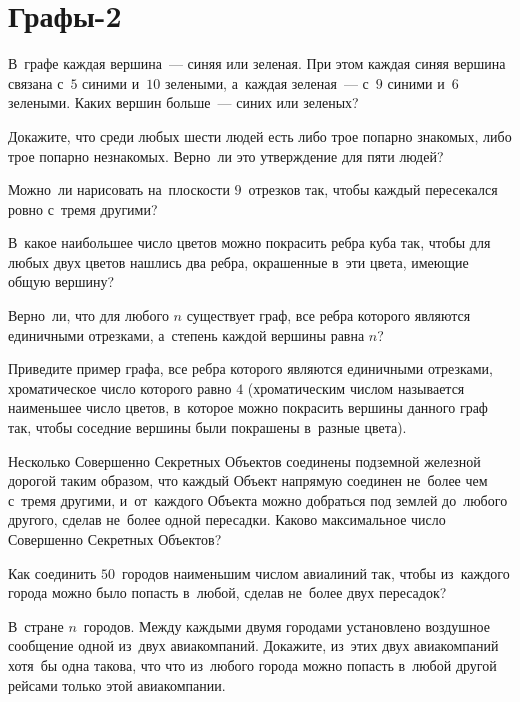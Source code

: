 
\section*{Графы-2}


\begin{problems}

\item
В~графе каждая вершина~--- синяя или зеленая.
При этом каждая синяя вершина связана с~$5$ синими и~$10$ зелеными, а~каждая
зеленая~--- с~$9$ синими и~$6$ зелеными.
Каких вершин больше~--- синих или зеленых?

\item
Докажите, что среди любых шести людей есть либо трое попарно знакомых, либо
трое попарно незнакомых.
Верно~ли это утверждение для пяти людей?

\item
Можно~ли нарисовать на~плоскости $9$~отрезков так, чтобы каждый пересекался
ровно с~тремя другими?

\item
В~какое наибольшее число цветов можно покрасить ребра куба так, чтобы для любых
двух цветов нашлись два ребра, окрашенные в~эти цвета, имеющие общую вершину?

\item
Верно~ли, что для любого $n$ существует граф, все ребра которого являются
единичными отрезками, а~степень каждой вершины равна $n$?

\item
Приведите пример графа, все ребра которого являются единичными отрезками,
хроматическое число которого равно $4$ (хроматическим числом называется
наименьшее число цветов, в~которое можно покрасить вершины данного граф так,
чтобы соседние вершины были покрашены в~разные цвета).

\item
Несколько Совершенно Секретных Объектов соединены подземной железной дорогой
таким образом,
что каждый Объект напрямую соединен не~более чем с~тремя другими, и~от~каждого
Объекта можно добраться под землей до~любого другого, сделав не~более одной
пересадки.
Каково максимальное число Совершенно Секретных Объектов?

\item
Как соединить $50$~городов наименьшим числом авиалиний так, чтобы из~каждого
города можно было попасть в~любой,
сделав не~более двух пересадок?

\item
В~стране $n$~городов.
Между каждыми двумя городами установлено воздушное сообщение одной из~двух
авиакомпаний.
Докажите, из~этих двух авиакомпаний хотя~бы одна такова, что что из~любого
города можно попасть в~любой другой рейсами только этой авиакомпании.

\end{problems}

